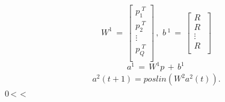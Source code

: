 \begin{equation*}
  W^{1}\,=\,\begin{bmatrix}
  {p_{1}^{\,\,T}}\\
  {p_{2}^{\,\,T}}\\
  {\vdots}\\
  {p_{Q}^{\,\,T}}\\
  \end{bmatrix}\,,\,\,b\,^{1}\,=\,\begin{bmatrix}
  {R^{\,}}\\
  {R^{\,}}\\
  {\vdots}\\
  {R^{\,\,}}\\
  \end{bmatrix}
\end{equation*}
\begin{equation*}
a^{1}\,=\,W^{1}p\,+\,b^{1}\,
\end{equation*}
\begin{align*}
a^2(t+1) = poslin(W^2a^2(t)).
\end{align*}
0\,<\,\varepsilon\,<\,
